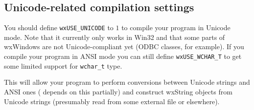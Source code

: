 
\subsection{Unicode-related compilation settings}

You should define {\tt wxUSE\_UNICODE} to $1$ to compile your program in
Unicode mode. Note that it currently only works in Win32 and that some parts of
wxWindows are not Unicode-compliant yet (ODBC classes, for example). If you
compile your program in ANSI mode you can still define {\tt wxUSE\_WCHAR\_T} 
to get some limited support for {\tt wchar\_t} type.

This will allow your program to perform conversions between Unicode strings and
ANSI ones ( depends on this
partially) and construct wxString objects from Unicode strings (presumably read
from some external file or elsewhere).

